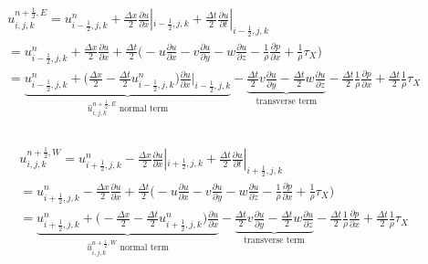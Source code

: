 \documentclass{article}
\numberwithin{equation}{subsection}
\begin{document}
\begin{align}
\begin{split}
& u_{i,j,k}^{n+\frac{1}{2},E} = u_{i-\frac{1}{2},j,k}^n + \frac{\Delta x}{2}\frac{\partial u}{\partial x}|_{i-\frac{1}{2},j,k} + \frac{\Delta t}{2}\frac{\partial u}{\partial t}|_{i-\frac{1}{2},j,k}\\
&= u_{i-\frac{1}{2},j,k}^n + \frac{\Delta x}{2} \frac{\partial u}{\partial x} + \frac{\Delta t}{2} \Big( -u\frac{\partial u}{\partial x} -v\frac{\partial u}{\partial y} -w\frac{\partial u}{\partial z} - \frac{1}{\rho}\frac{\partial p}{\partial x} +\frac{1}{\rho}\tau_X\Big) \\
&= \underbrace{u_{i-\frac{1}{2},j,k}^n + \Big(\frac{\Delta x}{2} - \frac{\Delta t}{2} u_{i-\frac{1}{2},j,k}^n\Big)\frac{\partial u}{\partial x}|_{i-\frac{1}{2},j,k}}_\text{$\widehat{u}_{i,j,k}^{n+\frac{1}{2},E}$ normal term} -\underbrace{\frac{\Delta t}{2}v\frac{\partial u}{\partial y} - \frac{\Delta t}{2}w\frac{\partial u}{\partial z}}_\text{transverse term} - \frac{\Delta t}{2}\frac{1}{\rho}\frac{\partial p}{\partial x} + \frac{\Delta t}{2}\frac{1}{\rho}\tau_X \\
\end{split}
\end{align}

\begin{align}
\begin{split}
& u_{i,j,k}^{n+\frac{1}{2},W} = u_{i+\frac{1}{2},j,k}^n - \frac{\Delta x}{2}\frac{\partial u}{\partial x}|_{i+\frac{1}{2},j,k} + \frac{\Delta t}{2}\frac{\partial u}{\partial t}|_{i+\frac{1}{2},j,k}\\
&= u_{i+\frac{1}{2},j,k}^n - \frac{\Delta x}{2} \frac{\partial u}{\partial x} + \frac{\Delta t}{2} \Big( -u\frac{\partial u}{\partial x} -v\frac{\partial u}{\partial y} -w\frac{\partial u}{\partial z} - \frac{1}{\rho}\frac{\partial p}{\partial x} + \frac{1}{\rho}\tau_X\Big) \\
&= \underbrace{u_{i+\frac{1}{2},j,k}^n + \Big(-\frac{\Delta x}{2} - \frac{\Delta t}{2} u_{i+\frac{1}{2},j,k}^n\Big)\frac{\partial u}{\partial x}}_\text{$\widehat{u}_{i,j,k}^{n+\frac{1}{2},W}$ normal term} -\underbrace{\frac{\Delta t}{2}v\frac{\partial u}{\partial y} - \frac{\Delta t}{2}w\frac{\partial u}{\partial z}}_\text{transverse term} - \frac{\Delta t}{2}\frac{1}{\rho}\frac{\partial p}{\partial x} + \frac{\Delta t}{2}\frac{1}{\rho}\tau_X \\
\end{split}
\end{align}
\end{document}

